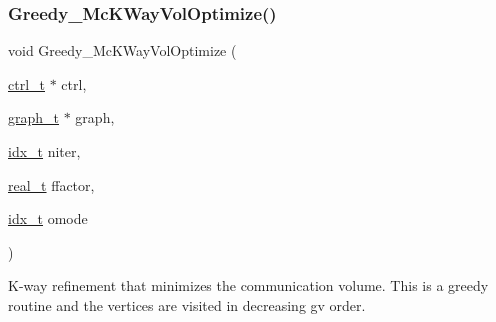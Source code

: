 \subsubsection{\texorpdfstring{Greedy\+\_\+\+Mc\+K\+Way\+Vol\+Optimize()}{Greedy\_McKWayVolOptimize()}}
{\footnotesize\ttfamily void Greedy\+\_\+\+Mc\+K\+Way\+Vol\+Optimize (\begin{DoxyParamCaption}\item[{\hyperlink{a00742}{ctrl\+\_\+t} $\ast$}]{ctrl,  }\item[{\hyperlink{a00734}{graph\+\_\+t} $\ast$}]{graph,  }\item[{\hyperlink{a00876_aaa5262be3e700770163401acb0150f52}{idx\+\_\+t}}]{niter,  }\item[{\hyperlink{a00876_a1924a4f6907cc3833213aba1f07fcbe9}{real\+\_\+t}}]{ffactor,  }\item[{\hyperlink{a00876_aaa5262be3e700770163401acb0150f52}{idx\+\_\+t}}]{omode }\end{DoxyParamCaption})}

K-\/way refinement that minimizes the communication volume. This is a greedy routine and the vertices are visited in decreasing gv order.


